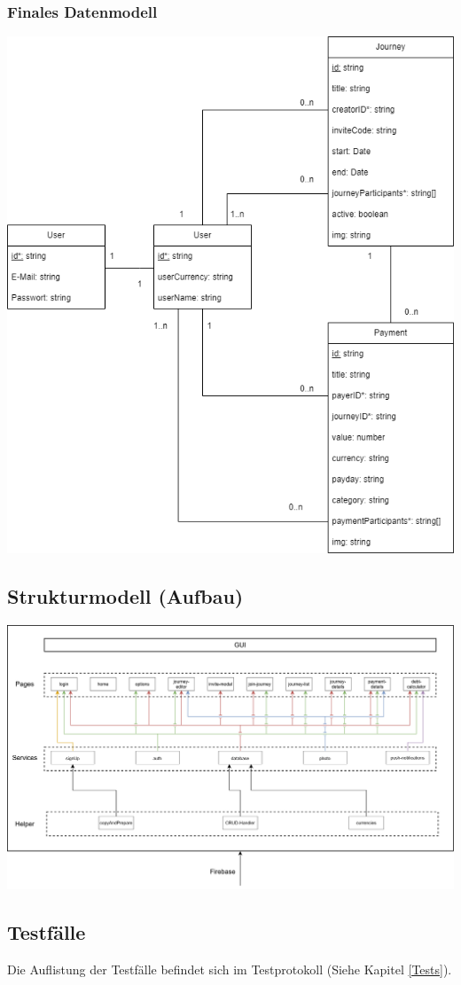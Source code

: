\subsubsection{Finales Datenmodell}
\includegraphics[width=170mm]{img/diagrams/Umgesetztes_UML.drawio}

\subsection{Strukturmodell (Aufbau)}

\includegraphics[width=170mm]{img/diagrams/Strukturdiagramm}

\subsection{Testfälle}

Die Auflistung der Testfälle befindet sich im Testprotokoll (Siehe Kapitel \ref{Tests}).